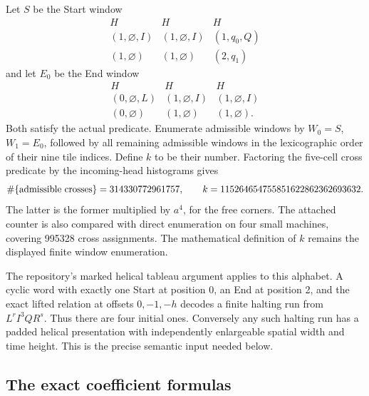 Let $S$ be the Start window
\[
\begin{array}{ccc}
H&H&H\\
(1,\varnothing,I)&(1,\varnothing,I)&(1,q_0,Q)\\
(1,\varnothing)&(1,\varnothing)&(2,q_1)
\end{array}
\]
and let $E_0$ be the End window
\[
\begin{array}{ccc}
H&H&H\\
(0,\varnothing,L)&(1,\varnothing,I)&(1,\varnothing,I)\\
(0,\varnothing)&(1,\varnothing)&(1,\varnothing).
\end{array}
\]
Both satisfy the actual predicate. Enumerate admissible windows by
$W_0=S$, $W_1=E_0$, followed by all remaining admissible windows in the
lexicographic order of their nine tile indices. Define $k$ to be their
number. Factoring the five-cell cross predicate by the incoming-head
histograms gives
\[
 \#\{\hbox{admissible crosses}\}=314330772961757,
 \qquad
 k=115264654755851622862362693632.
\]
The latter is the former multiplied by $a^4$, for the free corners.
The attached counter is also compared with direct enumeration on four
small machines, covering 995328 cross assignments. The mathematical
definition of $k$ remains the displayed finite window enumeration.

The repository's marked helical tableau argument applies to this
alphabet. A cyclic word with exactly one Start at position 0, an End at
position 2, and the exact lifted relation at offsets $0,-1,-h$ decodes a
finite halting run from $L^rI^3QR^s$. Thus there are four initial ones.
Conversely any such halting run has a padded helical presentation with
independently enlargeable spatial width and time height. This is the
precise semantic input needed below.

\subsection{The exact coefficient formulas}

